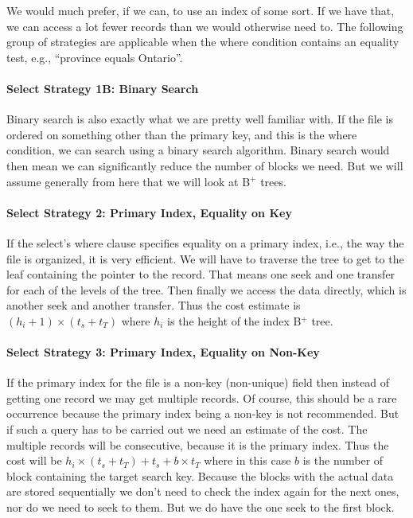 We would much prefer, if we can, to use an index of some sort. If we have that, we can access a lot fewer records than we would otherwise need to. The following group of strategies are applicable when the where condition contains an equality test, e.g., ``province equals Ontario''.

\paragraph{Select Strategy 1B: Binary Search}
Binary search is also exactly what we are pretty well familiar with. If the file is ordered on something other than the primary key, and this is the where condition, we can search using a binary search algorithm. Binary search would then mean we can significantly reduce the number of blocks we need. But we will assume generally from here that we will look at B$^{+}$ trees.

\paragraph{Select Strategy 2: Primary Index, Equality on Key}
If the select's where clause specifies equality on a primary index, i.e., the way the file is organized, it is very efficient. We will have to traverse the tree to get to the leaf containing the pointer to the record. That means one seek and one transfer for each of the levels of the tree. Then finally we access the data directly, which is another seek and another transfer. Thus the cost estimate is $(h_{i} + 1) \times (t_{s} + t_{T})$ where $h_{i}$ is the height of the index B$^{+}$ tree.

\paragraph{Select Strategy 3: Primary Index, Equality on Non-Key}
If the primary index for the file is a non-key (non-unique) field then instead of getting one record we may get multiple records. Of course, this should be a rare occurrence because the primary index being a non-key is not recommended. But if such a query has to be carried out we need an estimate of the cost. The multiple records will be consecutive, because it is the primary index. Thus the cost will be $h_{i} \times (t_{s} + t_{T}) + t_{s} + b \times t_{T}$ where in this case $b$ is the number of block containing the target search key. Because the blocks with the actual data are stored sequentially we don't need to check the index again for the next ones, nor do we need to seek to them. But we do have the one seek to the first block.

